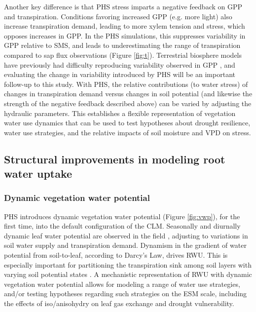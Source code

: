 \documentclass[draft,linenumbers]{agujournal}
\begin{document}
    Another key difference is that PHS stress imparts a negative feedback on GPP and transpiration.
    Conditions favoring increased GPP (e.g. more light) also increase transpiration demand, leading to more xylem tension and stress, which opposes increases in GPP.
    In the PHS simulations, this suppresses variability in GPP relative to SMS, and leads to underestimating the range of transpiration compared to sap flux observations (Figure \ref{fig:t}).
    Terrestrial biosphere models have previously had difficulty reproducing variability observed in GPP \citep{keenan2012}, and evaluating the change in variability introduced by PHS will be an important follow-up to this study.
    With PHS, the relative contributions (to water stress) of changes in transpiration demand versus changes in soil potential (and likewise the strength of the negative feedback described above) can be varied by adjusting the hydraulic parameters. 
    This establishes a flexible representation of vegetation water use dynamics that can be used to test hypotheses about drought resilience, water use strategies, and the relative impacts of soil moisture and VPD on stress.
    
\subsection{Structural improvements in modeling root water uptake}

\subsubsection{Dynamic vegetation water potential}

PHS introduces dynamic vegetation water potential (Figure \ref{fig:vwp}), for the first time, into the default configuration of the CLM.
Seasonally and diurnally dynamic leaf water potential are observed in the field \citep{fisher2006}, adjusting to variations in soil water supply and transpiration demand.
Dynamism in the gradient of water potential from soil-to-leaf, according to Darcy's Law, drives RWU.
This is especially important for partitioning the transpiration sink among soil layers with varying soil potential states \citep{jarvis2011}.
A mechanistic representation of RWU with dynamic vegetation water potential allows for modeling a range of water use strategies, and/or testing hypotheses regarding such strategies on the ESM scale, including the effects of iso/anisohydry on leaf gas exchange and drought vulnerability.
\end{document}

